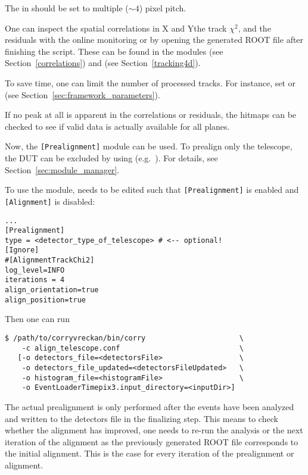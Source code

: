 The  in  should be set to multiple ($\sim4$) pixel pitch.

One can inspect the spatial correlations in X and Ythe track $\chi^2$, and the residuals with the online monitoring or by opening the generated ROOT file after finishing the script.
These can be found in the modules  (see Section~\ref{correlations}) and  (see Section~\ref{tracking4d}).

To save time, one can limit the number of processed tracks. For instance, set  or  (see Section~\ref{sec:framework_parameters}).

If no peak at all is apparent in the correlations or residuals, the hitmaps can be checked to see if valid data is actually available for all planes.

Now, the \texttt{[Prealignment]} module can be used.
To prealign only the telescope, the DUT can be excluded by using  (e.g.~). For details, see Section~\ref{sec:module_manager}.

To use the module,  needs to be edited such that \texttt{[Prealignment]} is enabled and \texttt{[Alignment]} is disabled:
\begin{verbatim}
...
[Prealignment]
type = <detector_type_of_telescope> # <-- optional!
[Ignore]
#[AlignmentTrackChi2]
log_level=INFO
iterations = 4
align_orientation=true
align_position=true
\end{verbatim}

Then one can run
\begin{verbatim}
$ /path/to/corryvreckan/bin/corry                      \
    -c align_telescope.conf                            \
   [-o detectors_file=<detectorsFile>                  \
    -o detectors_file_updated=<detectorsFileUpdated>   \
    -o histogram_file=<histogramFile>                  \
    -o EventLoaderTimepix3.input_directory=<inputDir>]
\end{verbatim}

The actual prealignment is only performed after the events have been analyzed and written to the detectors file in the finalizing step.
This means to check whether the alignment has improved, one needs to re-run the analysis or the next iteration of the alignment as the previously generated ROOT file corresponds to the initial alignment.
This is the case for every iteration of the prealignment or alignment.

